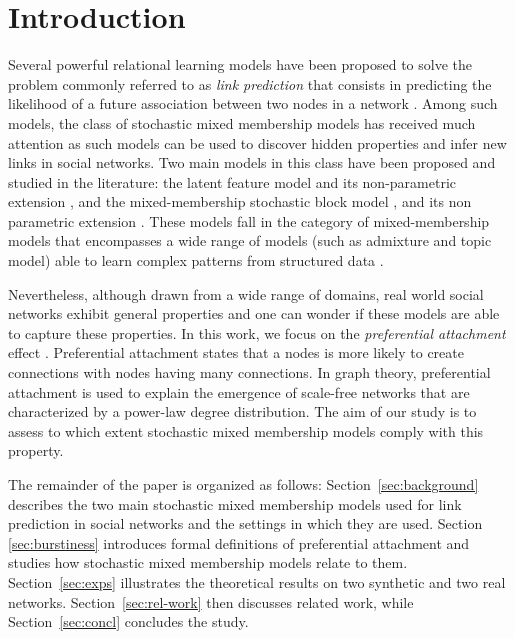 
\section{Introduction}
\label{sec:intro}

Several powerful relational learning models have been proposed to solve the problem commonly referred to as \textit{link prediction} that consists in predicting the likelihood of a future association between two nodes in a network \cite{LibenNowell07,HassanZaki11}. Among such models, the class of stochastic mixed membership models has received much attention as such models can be used to discover hidden properties and infer new links in social networks. Two main models in this class have been proposed and studied in the literature: the latent feature model \cite{BMF} and its non-parametric extension \cite{ILFRM}, and the mixed-membership stochastic block model \cite{MMSB}, and its non parametric extension \cite{iMMSB,fan2015dynamic}. These models fall in the category of mixed-membership models that encompasses a wide range of models (such as admixture and topic model) able to  learn complex patterns from structured data \cite{airoldi2014handbook}.

Nevertheless, although drawn from a wide range of domains, real world social networks exhibit general properties and one can wonder if these models are able to capture these properties. In this work, we focus on the \textit{preferential attachment} effect \cite{Newman2010, Barabasi2003}. Preferential attachment states that a nodes is more likely to create connections with nodes having many connections. In graph theory, preferential attachment is used to explain the emergence of scale-free networks that are characterized by a power-law degree distribution. The aim of our study is to assess to which extent stochastic mixed membership models comply with this property.

The remainder of the paper is organized as follows:  Section~\ref{sec:background} describes the two main stochastic mixed membership models used for link prediction in social networks and the settings in which they are used. Section \ref{sec:burstiness} introduces formal definitions of preferential attachment and studies how stochastic mixed membership models relate to them. Section~\ref{sec:exps} illustrates the theoretical results on two synthetic and two real networks. Section~\ref{sec:rel-work} then discusses related work, while Section~\ref{sec:concl} concludes the study.
